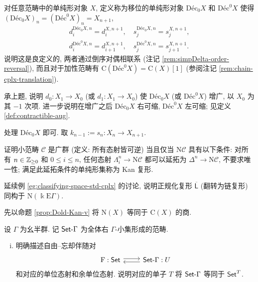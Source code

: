 \begin{Exercises}
	\item 对任意范畴中的单纯形对象 $X$, 定义称为移位的单纯形对象 $\mathrm{Déc}_0 X$ 和 $\mathrm{Déc}^0 X$ 使得 $(\mathrm{Déc}_0 X)_n = (\mathrm{Déc}^0 X)_n = X_{n+1}$,
	\begin{gather*}
		d^{\mathrm{Déc}_0 X, n}_i = d^{X, n+1}_i, \quad s^{\mathrm{Déc}_0 X, n}_j = s^{X, n+1}_j, \\
		d^{\mathrm{Déc}^0 X, n}_i = d^{X, n+1}_{i+1}, \quad
		s^{\mathrm{Déc}^0 X, n}_j = s^{X, n+1}_{j+1}.
	\end{gather*}
	说明这是良定义的, 两者通过倒序对偶相联系 (注记 \ref{rem:simpDelta-order-reversal}), 而且对于加性范畴有 $\mathrm{C}(\mathrm{Déc}^0 X) = \mathrm{C}(X)[1]$ (参阅注记 \ref{rem:chain-cplx-translation}).

	\item 承上题, 说明 $d_0: X_1 \to X_0$ (或 $d_1: X_1 \to X_0$) 使 $\mathrm{Déc}_0 X$ (或 $\mathrm{Déc}^0 X$) 增广, 以 $X_0$ 为其 $-1$ 次项. 进一步说明在增广之后 $\mathrm{Déc}_0 X$ 右可缩, $\mathrm{Déc}^0 X$ 左可缩; 见定义 \ref{def:contractible-aug}.
	\begin{hint}
		处理 $\mathrm{Déc}_0 X$ 即可. 取 $k_{n-1} := s_n: X_n \to X_{n+1}$.
	\end{hint}

	\item 证明小范畴 $\mathcal{C}$ 是广群 (定义: 所有态射皆可逆) 当且仅当 $\mathrm{N}\mathcal{C}$ 具有以下条件: 对所有 $n \in \mathbb{Z}_{\geq 0}$ 和 $0 \leq i \leq n$, 任何态射 $\Lambda^n_i \to \mathrm{N}\mathcal{C}$ 都可以延拓为 $\Delta^n \to \mathrm{N}\mathcal{C}$, 不要求唯一性; 满足此延拓条件的单纯形集称为 Kan 复形.

	\item 延续例 \ref{eg:classifying-space-std-cplx} 的讨论, 说明正规化复形 $\overline{\mathsf{L}}$ (翻转为链复形) 同构于 $\mathrm{N}(\Bbbk\mathrm{E}\Gamma)$.
	\begin{hint}
		先以命题 \ref{prop:Dold-Kan-v} 将 $\mathrm{N}(X)$ 等同于 $\mathrm{C}(X)$ 的商.
	\end{hint}
	
	\item 设 $\Gamma$ 为幺半群. 记 $\mathsf{Set}\text{-}\Gamma$ 为全体右 $\Gamma$-小集形成的范畴.
	\begin{enumerate}[(i)]
		\item 明确描述自由--忘却伴随对
		\[\begin{tikzcd}
			\mathrm{F}: \cate{Set} \arrow[shift left, r] & \cated{Set}\Gamma \arrow[shift left, l]: U
		\end{tikzcd}\]
		和对应的单位态射和余单位态射. 说明对应的单子 $T$ 将 $\mathsf{Set}\text{-}\Gamma$ 等同于 $\mathsf{Set}^T$.
		

\end{enumerate}
\end{Exercises}
